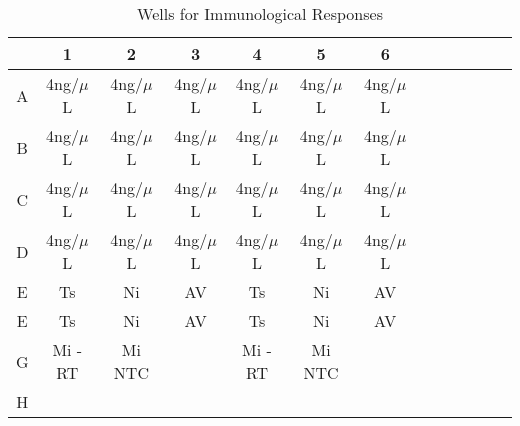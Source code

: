 \documentclass[journal, a4paper]{IEEEtran}
\begin{document}
  \begin{table}[!hbt]
    \begin{center}
    \caption{Wells for Immunological Responses}
    \label{tab:simParameters}
    \begin{tabular}{|c|c|c|c|c|c|c|c|c|c|c|c|c|}
      \hline
      & 1 & 2 & 3 & 4 & 5 & 6\\
      \hline
      A & 4ng/$\mu$L & 4ng/$\mu$L & 4ng/$\mu$L & 4ng/$\mu$L & 4ng/$\mu$L & 4ng/$\mu$L\\
      \hline
      B & 4ng/$\mu$L & 4ng/$\mu$L & 4ng/$\mu$L & 4ng/$\mu$L & 4ng/$\mu$L & 4ng/$\mu$L\\
      \hline
      C & 4ng/$\mu$L & 4ng/$\mu$L & 4ng/$\mu$L & 4ng/$\mu$L & 4ng/$\mu$L & 4ng/$\mu$L\\
      \hline
      D & 4ng/$\mu$L & 4ng/$\mu$L & 4ng/$\mu$L & 4ng/$\mu$L & 4ng/$\mu$L & 4ng/$\mu$L\\
      \hline
      E & Ts & Ni & AV & Ts & Ni & AV\\
      \hline
      E & Ts & Ni & AV & Ts & Ni & AV\\
      \hline
      G & Mi -RT & Mi NTC & & Mi -RT & Mi NTC & \\
      \hline
      H & & & & & &\\
      \hline
    \end{tabular}
    \end{center}
  \end{table}

\end{document}
